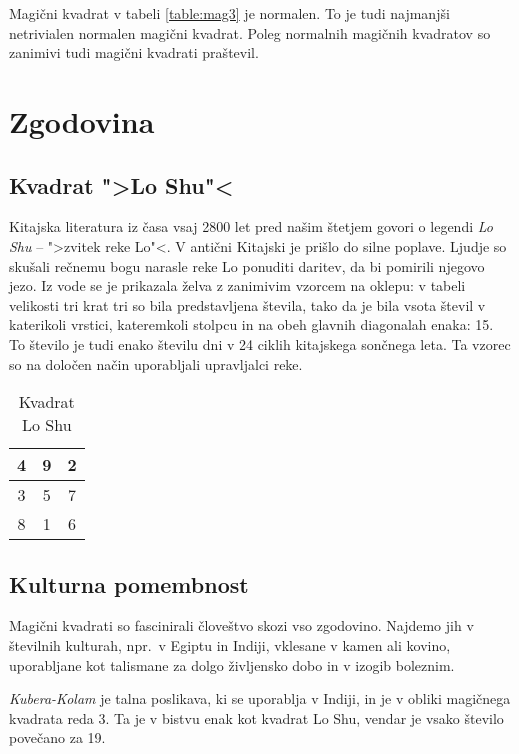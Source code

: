 \documentclass[a4paper,12pt]{article}
\newcommand{\pojem}[1]{\emph{\color{purple}#1}}
\theoremstyle{definition}
\theoremstyle{plain}
\newenvironment{magic}[3]
{
   \begin{table}[!ht]
      \centering
      \caption{#2}
      \label{#3}
      \large
      \begin{tabular}{|*{#1}{c|}}
      \hline
}
{
      \end{tabular}
      \normalsize
   \end{table}
}
\begin{document}
Magični kvadrat v tabeli \ref{table:mag3} je normalen.
To je tudi najmanjši netrivialen normalen magični kvadrat.
Poleg normalnih magičnih kvadratov so zanimivi tudi magični kvadrati praštevil.


\section{Zgodovina}

\subsection{Kvadrat ">Lo Shu"<}

Kitajska literatura iz časa vsaj 2800 let pred našim štetjem govori o legendi
\pojem{Lo Shu} -- ">zvitek reke Lo"<. V antični Kitajski je prišlo do
silne poplave. Ljudje so skušali rečnemu bogu narasle reke Lo ponuditi daritev,
da bi pomirili njegovo jezo. Iz vode se je prikazala želva z zanimivim vzorcem
na oklepu: v tabeli velikosti tri krat tri so bila predstavljena števila, tako
da je bila vsota števil v katerikoli vrstici, kateremkoli stolpcu in na obeh
glavnih diagonalah enaka: 15. To število je tudi enako številu dni v 24 ciklih
kitajskega sončnega leta. Ta vzorec so na določen način uporabljali upravljalci
reke.

\begin{magic}{3}{Kvadrat Lo Shu}{table:loshu}
   4 & 9 & 2 \\\hline
   3 & 5 & 7 \\\hline
   8 & 1 & 6 \\\hline
\end{magic}


\subsection{Kulturna pomembnost}

Magični kvadrati so fascinirali človeštvo skozi vso zgodovino. Najdemo jih
v številnih kulturah, npr.\ v Egiptu in Indiji, vklesane v kamen ali
kovino, uporabljane kot talismane za dolgo življensko dobo in v
izogib boleznim.

\pojem{Kubera-Kolam} je talna poslikava, ki se uporablja v Indiji, in je v
obliki magičnega kvadrata reda 3. Ta je v bistvu enak kot kvadrat
Lo Shu, vendar je vsako število povečano za 19.
\end{document}
